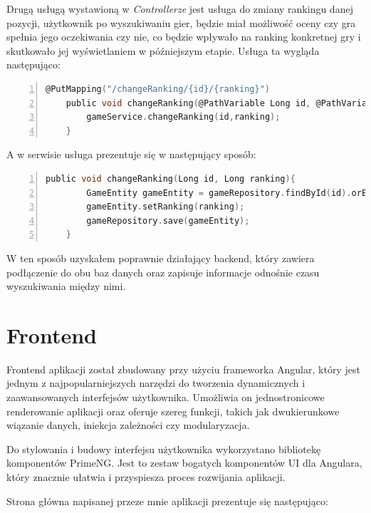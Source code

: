Drugą usługą wystawioną w \textit{Controllerze} jest usługa do zmiany rankingu danej pozycji, użytkownik po wyszukiwaniu gier, będzie miał możliwość oceny czy gra spełnia jego oczekiwania czy nie, co będzie wpływało na ranking konkretnej gry i skutkowało jej wyświetlaniem w późniejszym etapie. Usługa ta wygląda następująco:
\begin{lstlisting}[language=C, mathescape, frame=single, numbers=left, xleftmargin=2em, framexleftmargin=2em, basicstyle=\ttfamily\bfseries, caption={Kontroler do zmiany rankingu}, label={Kontroler do zmiany rankingu}]
    @PutMapping("/changeRanking/{id}/{ranking}")
    public void changeRanking(@PathVariable Long id, @PathVariable Long ranking){
        gameService.changeRanking(id,ranking);
    }
\end{lstlisting}
A w serwisie usługa prezentuje się w następujący sposób:
\begin{lstlisting}[language=C, mathescape, frame=single, numbers=left, xleftmargin=2em, framexleftmargin=2em, basicstyle=\ttfamily\bfseries, caption={Obsługa zmiany rankingu}, label={Obsługa zmiany rankingu}]
    public void changeRanking(Long id, Long ranking){
        GameEntity gameEntity = gameRepository.findById(id).orElseThrow(() -> new RuntimeException("Nie znaleziono gry o podanym id"));
        gameEntity.setRanking(ranking);
        gameRepository.save(gameEntity);
    }
\end{lstlisting}
W ten sposób uzyskałem poprawnie działający backend, który zawiera podłączenie do obu baz danych oraz zapisuje informacje odnośnie czasu wyszukiwania między nimi.

\section{Frontend}
Frontend aplikacji został zbudowany przy użyciu frameworka Angular, który jest jednym z najpopularniejszych narzędzi do tworzenia dynamicznych i zaawansowanych interfejsów użytkownika. Umożliwia on jednostronicowe renderowanie aplikacji oraz oferuje szereg funkcji, takich jak dwukierunkowe wiązanie danych, iniekcja zależności czy modularyzacja.

Do stylowania i budowy interfejsu użytkownika wykorzystano bibliotekę komponentów PrimeNG. Jest to zestaw bogatych komponentów UI dla Angulara, który znacznie ułatwia i przyspiesza proces rozwijania aplikacji.

Strona główna napisanej przeze mnie aplikacji prezentuje się następująco:


